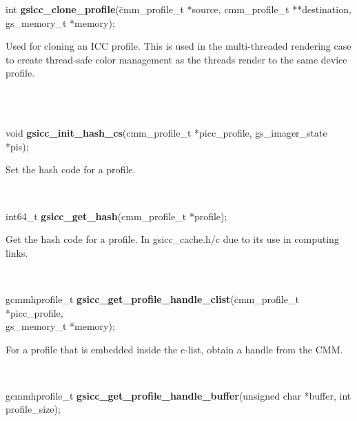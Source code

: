 \documentclass[12pt,notitlepage]{article}
\begin{document}
\begin{tabbing}
\noindent int {\bf gsicc\_clone\_profile}(\=cmm\_profile\_t *source, cmm\_profile\_t **destination, \\
\>gs\_memory\_t *memory);\\
\end{tabbing}

\begin{minipage}[h]{6.0in}
Used for cloning an ICC profile.  This is used in the multi-threaded rendering case to create thread-safe color management as the threads render to the same device profile.
\end{minipage}\\
\\

\begin{tabbing}
\noindent void {\bf gsicc\_init\_hash\_cs}(cmm\_profile\_t *picc\_profile, gs\_imager\_state *pis);\\
\end{tabbing}

\begin{minipage}[h]{6.0in}
Set the hash code for a profile.
\end{minipage}\\

\begin{tabbing}
\noindent int64\_t {\bf gsicc\_get\_hash}(cmm\_profile\_t *profile);\\
\end{tabbing}

\begin{minipage}[h]{6.0in}
Get the hash code for a profile.  In gsicc\_cache.h/c due to its use in computing links.
\end{minipage}\\

\begin{tabbing}
\noindent gcmmhprofile\_t {\bf gsicc\_get\_profile\_handle\_clist}(\=cmm\_profile\_t *picc\_profile, \\
\>gs\_memory\_t *memory);\\
\end{tabbing}

\begin{minipage}[h]{6.0in}
For a profile that is embedded inside the c-list, obtain a handle from the CMM.
\end{minipage}\\

\begin{tabbing}
\noindent gcmmhprofile\_t {\bf gsicc\_get\_profile\_handle\_buffer}(unsigned char *buffer, int profile\_size);\\
\end{tabbing}
\end{document}
